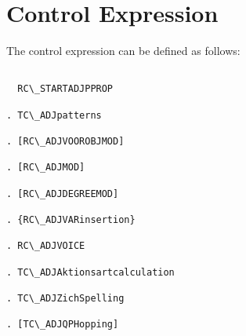 \section{Control Expression}
The control expression can be defined as follows:
\begin{verbatim}
 
  RC\_STARTADJPPROP

. TC\_ADJpatterns
   
. [RC\_ADJVOOROBJMOD]

. [RC\_ADJMOD]

. [RC\_ADJDEGREEMOD]

. {RC\_ADJVARinsertion}

. RC\_ADJVOICE
 
. TC\_ADJAktionsartcalculation

. TC\_ADJZichSpelling

. [TC\_ADJQPHopping]

\end{verbatim}


